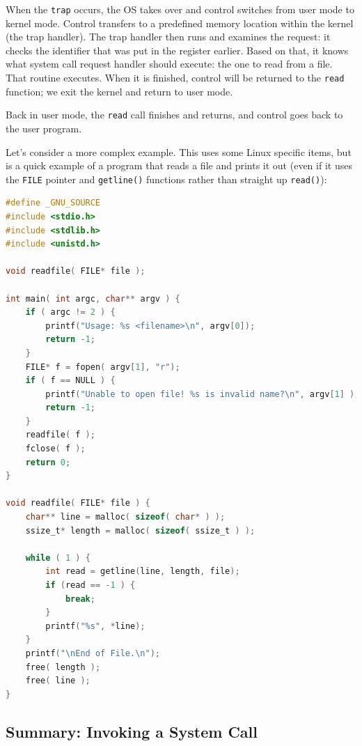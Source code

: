 When the \texttt{trap} occurs, the OS takes over and control switches from user mode to kernel mode. Control transfers to a predefined memory location within the kernel (the trap handler). The trap handler then runs and examines the request: it checks the identifier that was put in the register earlier. Based on that, it knows what system call request handler should execute: the one to read from a file. That routine executes. When it is finished, control will be returned to the \texttt{read} function; we exit the kernel and return to user mode.

Back in user mode, the \texttt{read} call finishes and returns, and control goes back to the user program.

Let's consider a more complex example. This uses some Linux specific items, but is a quick example of a program that reads a file and prints it out (even if it uses the \texttt{FILE} pointer and \texttt{getline()} functions rather than straight up \texttt{read()}):

\begin{lstlisting}[language=C]
#define _GNU_SOURCE
#include <stdio.h>
#include <stdlib.h>
#include <unistd.h>

void readfile( FILE* file );

int main( int argc, char** argv ) {
    if ( argc != 2 ) {
        printf("Usage: %s <filename>\n", argv[0]);
        return -1;
    }
    FILE* f = fopen( argv[1], "r");
    if ( f == NULL ) {
        printf("Unable to open file! %s is invalid name?\n", argv[1] );
        return -1;
    }
    readfile( f );
    fclose( f );
    return 0;
}

void readfile( FILE* file ) {
    char** line = malloc( sizeof( char* ) );
    ssize_t* length = malloc( sizeof( ssize_t ) );
    
    while ( 1 ) {
        int read = getline(line, length, file);
        if (read == -1 ) {
            break;
        }
        printf("%s", *line);
    }
    printf("\nEnd of File.\n");
    free( length );
    free( line );
}
\end{lstlisting}


\subsection*{Summary: Invoking a System Call}

